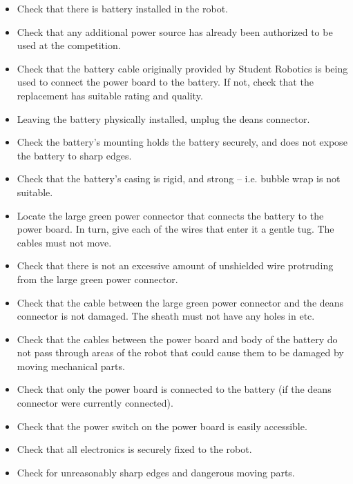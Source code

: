 \begin{itemize}
\item Check that there is battery installed in the robot.
\item Check that any additional power source has already been authorized to be used at the competition.
\item Check that the battery cable originally provided by Student Robotics is being used to connect the power board to the battery. If not, check that the replacement has suitable rating and quality.
\item Leaving the battery physically installed, unplug the deans connector.
\item Check the battery's mounting holds the battery securely, and does not expose the battery to sharp edges.
\item Check that the battery's casing is rigid, and strong -- i.e. bubble wrap is not suitable.
\item Locate the large green power connector that connects the battery to the power board. In turn, give each of the wires that enter it a gentle tug. The cables must not move.
\item Check that there is not an excessive amount of unshielded wire protruding from the large green power connector.
\item Check that the cable between the large green power connector and the deans connector is not damaged. The sheath must not have any holes in etc.
\item Check that the cables between the power board and body of the battery do not pass through areas of the robot that could cause them to be damaged by moving mechanical parts.
\item Check that only the power board is connected to the battery (if the deans connector were currently connected).
\item Check that the power switch on the power board is easily accessible.
\item Check that all electronics is securely fixed to the robot.
\item Check for unreasonably sharp edges and dangerous moving parts.
\end{itemize}
